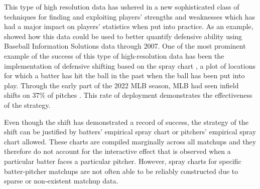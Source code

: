 \documentclass[12pt]{article}
\begin{document}
This type of high resolution data has ushered in a new sophisticated class of techniques for finding and exploiting players' strengths and weaknesses which has had a major impact on players' statistics when put into practice. As an example, \cite{jensen2009bayesball} showed how this data could be used to better quantify defensive ability using Baseball Information Solutions data through 2007. One of the most prominent example of the success of this type of high-resolution data has been the implementation of defensive shifting based on the spray chart \citep{pettispray, marchi2019analyzing}, a plot of locations for which a batter has hit the ball in the past when the ball has been put into play. Through the early part of the 2022 MLB season, MLB had seen infield shifts on 37\% of pitches \citep{baccellieri2022infield}. This rate of deployment demonstrates the effectiveness of the strategy.

Even though the shift has demonstrated a record of success, the strategy of the shift can be justified by batters' empirical spray chart or pitchers' empirical spray chart allowed. These charts are compiled marginally across all matchups and they therefore do not account for the interactive effect that is observed when a particular batter faces a particular pitcher. However, spray charts for specific batter-pitcher matchups are not often able to be reliably constructed due to sparse or non-existent matchup data. 
\end{document}
